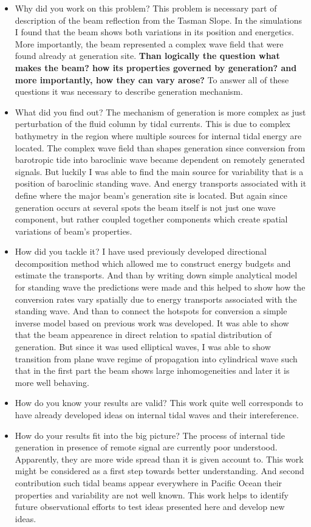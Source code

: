 \begin{itemize}
\item Why did you work on this problem?
This problem is necessary part of description of the beam reflection from the Tasman Slope. In the simulations I found that the beam shows both variations in its position and energetics. More importantly, the beam represented  a complex wave field that were found already at generation site. \textbf{Than logically the question what makes the beam? how its properties governed by generation? and more importantly, how they can vary arose?} To answer all of these questions it was necessary to describe generation mechanism.

\item What did you find out?
The mechanism of generation is more complex as just perturbation of the fluid column by tidal currents. This is due to complex bathymetry in the region where multiple sources for internal tidal energy are located. The complex wave field than shapes generation since conversion from barotropic tide into baroclinic wave became dependent on remotely generated signals. But luckily I was able to find the main source for variability that is a position of baroclinic standing wave. And energy transports associated with it define where the major beam's generation site is located. But again since generation occurs at several spots the beam itself is not just one wave component, but rather coupled together components which create spatial variations of beam's properties.

\item How did you tackle it?
I have used previously developed directional decomposition method which allowed me to construct energy budgets and estimate the transports. And than by writing down simple analytical model for standing wave the predictions were made and this helped to show how the conversion rates vary spatially due to energy transports associated with the standing wave. And than to connect the hotspots for conversion a simple inverse model based on previous work was developed. It was able to show that the beam appearence in direct relation to spatial distribution of generation. But since it was used elliptical waves, I was able to show transition from plane wave regime of propagation into cylindrical wave such that in the first part the beam shows large inhomogeneities and later it is more well behaving.

\item How do you know your results are valid?
This work quite well corresponds to have already developed ideas on internal tidal waves and their intereference.
\item How do your results fit into the big picture?
The process of internal tide generation in presence of remote signal are currently poor understood. Apparently, they are more wide spread than it is given account to. This work might be considered as a first step towards better understanding. And second contribution such tidal beams appear everywhere in Pacific Ocean their properties and variability are not well known. This work helps to identify future observational efforts to test ideas presented here and develop new ideas.


\end{itemize}
